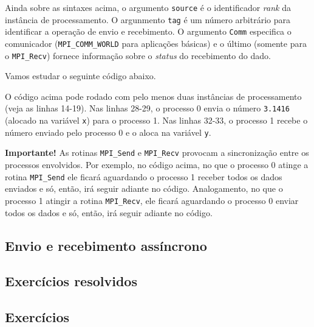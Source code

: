 Ainda sobre as sintaxes acima, o argumento \verb+source+ é o identificador {\it rank} da instância de processamento. O argunmento \verb+tag+ é um número arbitrário para identificar a operação de envio e recebimento. O argumento \verb+Comm+ especifica o comunicador (\verb+MPI_COMM_WORLD+ para aplicações básicas) e o último (somente para o \verb+MPI_Recv+) fornece informação sobre o {\it status} do recebimento do dado.

Vamos estudar o seguinte código abaixo.



O código acima pode rodado com pelo menos duas instâncias de processamento (veja as linhas 14-19). Nas linhas 28-29, o processo 0 envia o número \verb+3.1416+ (alocado na variável \verb+x+) para o processo 1. Nas linhas 32-33, o processo 1 recebe o número enviado pelo processo 0 e o aloca na variável \verb+y+.

{\bf Importante!} As rotinas \verb+MPI_Send+ e \verb+MPI_Recv+ provocam a sincronização entre os processos envolvidos. Por exemplo, no código acima, no que o processo 0 atinge a rotina \verb+MPI_Send+ ele ficará aguardando o processo 1 receber todos os dados enviados e só, então, irá seguir adiante no código. Analogamento, no que o processo 1 atingir a rotina \verb+MPI_Recv+, ele ficará aguardando o processo 0 enviar todos os dados e só, então, irá seguir adiante no código.

\subsection {Envio e recebimento assíncrono}

\emconstrucao

\subsection* {Exercícios resolvidos}

\emconstrucao

\subsection* {Exercícios}

\emconstrucao